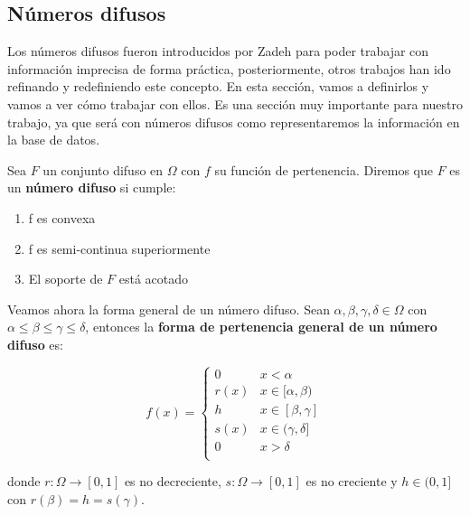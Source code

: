 \subsection{Números difusos}\label{fuzzynumbers}

Los números difusos fueron introducidos por Zadeh \cite{fuzzynumberszadeh} para poder trabajar con información imprecisa de forma práctica, posteriormente, otros trabajos han ido refinando y redefiniendo este concepto. En esta sección, vamos a definirlos y vamos a ver cómo trabajar con ellos. Es una sección muy importante para nuestro trabajo, ya que será con números difusos como representaremos la información en la base de datos. 

\begin{definition}
Sea $F$ un conjunto difuso en $\Omega$ con $f$ su función de pertenencia. Diremos que $F$ es un \textbf{número difuso} si cumple:

\begin{enumerate}
    \item f es convexa
    \item f es semi-continua superiormente
    \item El soporte de $F$ está acotado 
\end{enumerate}
\end{definition}

Veamos ahora la forma general de un número difuso. Sean $\alpha, \beta, \gamma, \delta \in \Omega$ con $\alpha \leq \beta \leq \gamma \leq \delta$, entonces la \textbf{forma de pertenencia general de un número difuso} es:

\begin{equation*}
    f(x) = \left\{ { \begin{array}{cc}
                    0 & x < \alpha \\ 
                    r(x) & x\in [\alpha,\beta) \\
                    h & x\in [\beta,\gamma] \\
                    s(x) & x\in (\gamma,\delta] \\
                    0 & x > \delta \\ 
                    \end{array}  } \right.
\end{equation*}

donde $r: \Omega \longrightarrow [0,1]$ es no decreciente, $s: \Omega \longrightarrow [0,1]$ es no creciente y $h \in (0,1]$ con $r(\beta) = h = s(\gamma)$.

